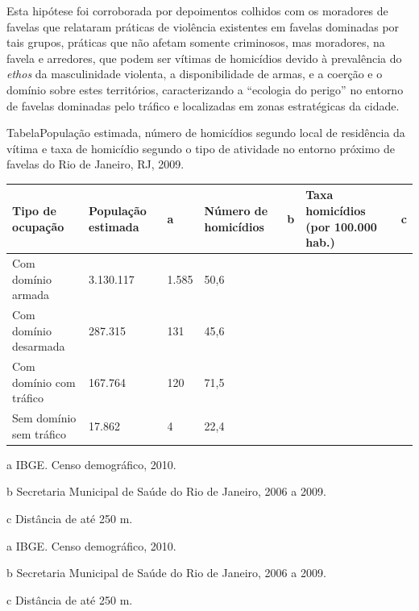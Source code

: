 \documentclass{article}
\begin{document}
Esta hipótese foi corroborada por depoimentos colhidos com os moradores de
favelas que relataram práticas de violência existentes em favelas dominadas por
tais grupos, práticas que não afetam somente criminosos, mas moradores, na
favela e arredores, que podem ser vítimas de homicídios devido à prevalência do
\textit{ethos}
da masculinidade violenta, a disponibilidade de armas, e a coerção e o domínio
sobre estes territórios, caracterizando a “ecologia do perigo” no entorno de
favelas dominadas pelo tráfico e localizadas em zonas estratégicas da cidade.

TabelaPopulação estimada, número de homicídios segundo local de residência da
vítima e taxa de homicídio segundo o tipo de atividade no entorno próximo de
favelas do Rio de Janeiro, RJ, 2009.
\begin{table}
\begin{xtabular}{ l | l | l | l | l | l | l }
\hline
Tipo de ocupação & População estimada & a & Número de homicídios & b & Taxa
homicídios (por 100.000 hab.) & c\\ \hline
Com domínio armada
& 3.130.117
& 1.585
& 50,6
\\ \hline

Com domínio desarmada
& 287.315
& 131
& 45,6
\\ \hline

Com domínio com tráfico
& 167.764
& 120
& 71,5
\\ \hline

Sem domínio sem tráfico
& 17.862
& 4
& 22,4
\\ \hline

\end{xtabular}
\end{table}

a IBGE. Censo demográfico, 2010.

b Secretaria Municipal de Saúde do Rio de Janeiro, 2006 a 2009.

c Distância de até 250 m.

a IBGE. Censo demográfico, 2010.

b Secretaria Municipal de Saúde do Rio de Janeiro, 2006 a 2009.

c Distância de até 250 m.
\end{document}
